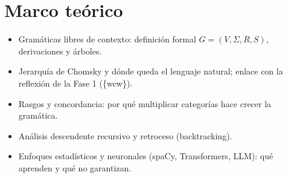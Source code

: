 \section{Marco teórico}
\label{sec:marco_teorico}


\begin{itemize}
  \item Gramáticas libres de contexto: definición formal $G = (V, \Sigma, R, S)$, derivaciones y árboles.
  \item Jerarquía de Chomsky y dónde queda el lenguaje natural; enlace con la reflexión de la Fase 1 (\{wcw\}).
  \item Rasgos y concordancia: por qué multiplicar categorías hace crecer la gramática.
  \item Análisis descendente recursivo y retroceso (backtracking).
  \item Enfoques estadísticos y neuronales (spaCy, Transformers, LLM): qué aprenden y qué no garantizan.
\end{itemize}
